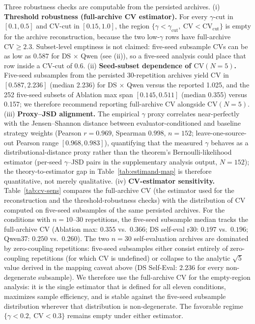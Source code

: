 \documentclass[11pt]{article}
\begin{document}
Three robustness checks are computable from the persisted archives. (i) \textbf{Threshold robustness (full-archive CV estimator).} For every $\gamma$-cut in $[0.1, 0.5]$ and $\mathrm{CV}$-cut in $[0.15, 1.0]$, the region $\{\gamma < \gamma_{\mathrm{cut}},\ \mathrm{CV} < \mathrm{CV}_{\mathrm{cut}}\}$ is empty for the archive reconstruction, because the two low-$\gamma$ rows have full-archive $\mathrm{CV} \geq 2.3$. Subset-level emptiness is not claimed: five-seed subsample $\mathrm{CV}$s can be as low as $0.587$ for DS $\times$ Qwen (see (ii)), so a five-seed analysis could place that row inside a $\mathrm{CV}$-cut of $0.6$. (ii) \textbf{Seed-subset dependence of $\mathrm{CV}(N{=}5)$.} Five-seed subsamples from the persisted 30-repetition archives yield $\mathrm{CV}$ in $[0.587, 2.236]$ (median 2.236) for DS $\times$ Qwen versus the reported 1.025, and the 252 five-seed subsets of Ablation max span $[0.145, 0.511]$ (median 0.355) versus 0.157; we therefore recommend reporting full-archive $\mathrm{CV}$ alongside $\mathrm{CV}(N{=}5)$. (iii) \textbf{Proxy--JSD alignment.} The empirical $\gamma$ proxy correlates near-perfectly with the Jensen--Shannon distance between evaluator-conditioned and baseline strategy weights (Pearson $r = 0.969$, Spearman $0.998$, $n = 152$; leave-one-source-out Pearson range $[0.968, 0.983]$), quantifying that the measured $\gamma$ behaves as a distributional-distance proxy rather than the theorem's Bernoulli-likelihood estimator (per-seed $\gamma$--JSD pairs in the supplementary analysis output, $N{=}152$); the theory-to-estimator gap in Table~\ref{tab:estimand-map} is therefore quantitative, not merely qualitative.
(iv) \textbf{CV-estimator sensitivity.} Table~\ref{tab:cv-sens} compares the full-archive CV (the estimator used for the reconstruction and the threshold-robustness checks) with the distribution of CV computed on five-seed subsamples of the same persisted archives. For the conditions with $n{=}10$--$30$ repetitions, the five-seed subsample median tracks the full-archive CV (Ablation max: $0.355$ vs.\ $0.366$; DS self-eval r30: $0.197$ vs.\ $0.196$; Qwen37: $0.250$ vs.\ $0.260$). The two $n{=}30$ self-evaluation archives are dominated by zero-coupling repetitions: five-seed subsamples either consist entirely of zero-coupling repetitions (for which CV is undefined) or collapse to the analytic $\sqrt{5}$ value derived in the mapping caveat above (DS Self-Eval: $2.236$ for every non-degenerate subsample). We therefore use the full-archive CV for the empty-region analysis: it is the single estimator that is defined for all eleven conditions, maximizes sample efficiency, and is stable against the five-seed subsample distribution wherever that distribution is non-degenerate. The favorable regime $\{\gamma<0.2,\ \mathrm{CV}<0.3\}$ remains empty under either estimator.
\end{document}
